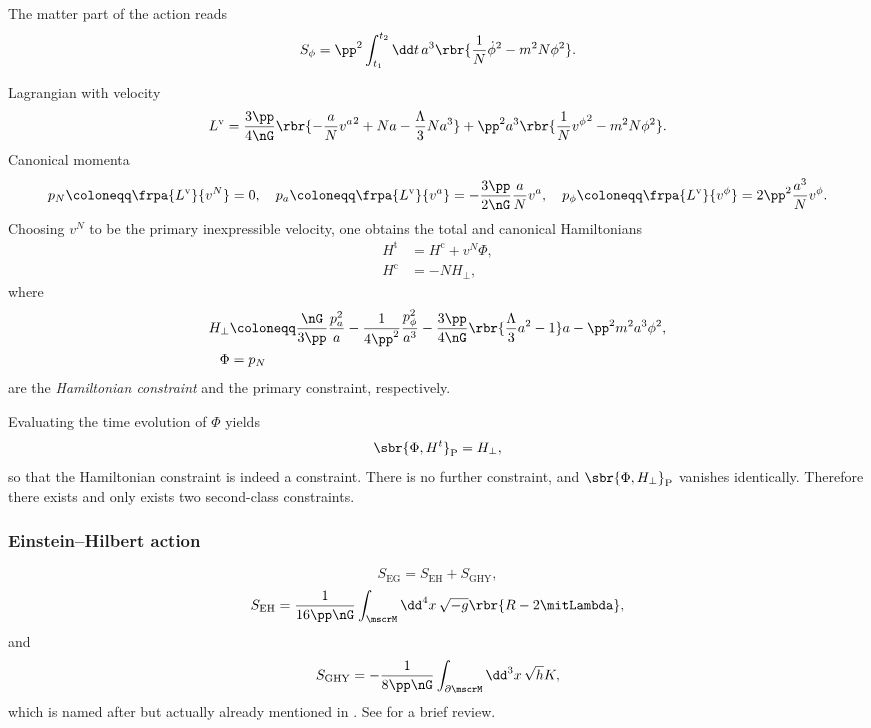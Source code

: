 \documentclass[a4paper,11pt]{article}
\begin{document}
The matter part of the action reads
\begin{equation}
S_\phi = \pp^2 \int_{t_1}^{t_2}\dd t\,
a^3 \rbr{\frac{1}{N}\dot{\phi}^2 - m^2N\phi^2}.
\end{equation}

Lagrangian with velocity
\begin{equation}
L^\text{v} = \frac{3\pp}{4\nG}\rbr{-\frac{a}{N} {v^a}^2 + Na - 
\frac{\Lambda}{3} Na^3} + \pp^2 a^3 \rbr{\frac{1}{N}{v^\phi}^2 - m^2 N 
\phi^2}.
\end{equation}
Canonical momenta
\begin{equation}
p_N \coloneqq \frpa{L^\text{v}}{v^N} = 0,\quad
p_a \coloneqq \frpa{L^\text{v}}{v^a} = -\frac{3\pp}{2\nG} \frac{a}{N} v^a,\quad
p_\phi \coloneqq \frpa{L^\text{v}}{v^\phi} = 2\pp^2 \frac{a^3}{N} v^\phi.
\end{equation}
Choosing $v^N$ to be the primary inexpressible velocity, one obtains the total 
and canonical Hamiltonians
\begin{align}
H^\text{t} &= H^\text{c} + v^N \Phi, \\
H^\text{c} &= -N H_\perp,
\end{align}
where
\begin{align}
H_\perp &\coloneqq \frac{\nG}{3\pp} \frac{p_a^2}{a}  - \frac{1}{4\pp^2} 
\frac{p_\phi^2}{a^3}  - \frac{3\pp}{4\nG}\rbr{\frac{\Lambda}{3}a^2 - 1}a
- \pp^2 m^2 a^3 \phi^2, \\
\Phi &= p_N
\end{align}
are the \emph{Hamiltonian constraint} and the primary constraint, respectively.

Evaluating the time evolution of $\Phi$ yields
\begin{equation}
\sbr{\Phi,H^t}_\text{P} = H_\perp,
\end{equation}
so that the Hamiltonian constraint is indeed a constraint. There is no further 
constraint, and $\sbr{\Phi, H_\perp}_\text{P}$ vanishes identically. Therefore 
there exists and only exists two second-class constraints.





\subsubsection{Einstein--Hilbert action}

\begin{equation}
S_\text{EG} = S_\text{EH} + S_\text{GHY},
\label{eq:action-einstein-gravity}
\end{equation}
\begin{equation}
S_\text{EH} = \frac{1}{16\pp\nG}\int_\mscrM\dd^4 x\,\sqrt{-g} 
\rbr{R-2\mitLambda},
\end{equation}
and
\begin{equation}
S_\text{GHY} = -\frac{1}{8\pp\nG}\int_{\partial\mscrM}\dd^3 x\,\sqrt{h} K,
\end{equation}
which is named after \cite{Gibbons1977,York1972} but actually already mentioned 
in \cite{Einstein1916}. See \cite{Dyer2009} for a brief review.


\printbibliography
\end{document}
